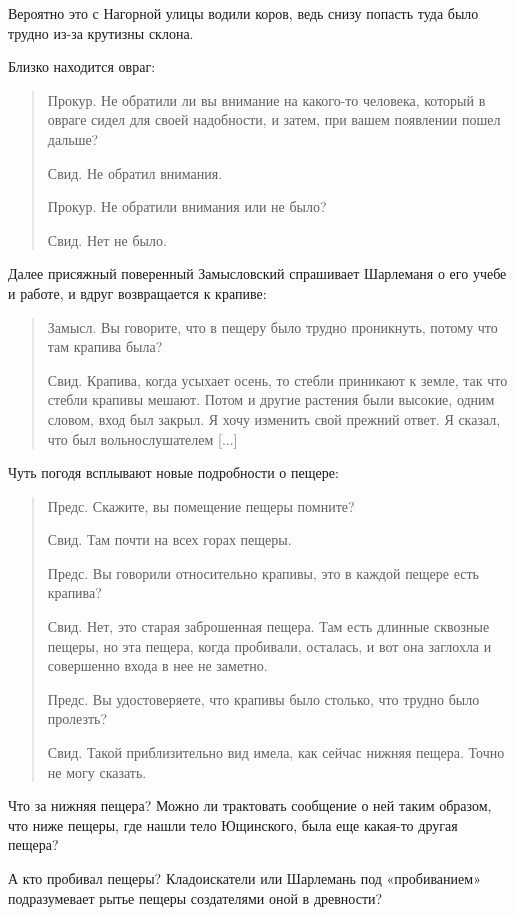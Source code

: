 Вероятно это с Нагорной улицы водили коров, ведь снизу попасть туда было трудно из-за крутизны склона.

Близко находится овраг:

\begin{quotation}
Прокур. Не обратили ли вы внимание на какого-то человека, который в овраге сидел для своей надобности, и затем, при вашем появлении пошел дальше?

Свид. Не обратил внимания.

Прокур. Не обратили внимания или не было?

Свид. Нет не было.
\end{quotation}

Далее присяжный поверенный Замысловский спрашивает Шарлеманя о его учебе и работе, и вдруг возвращается к крапиве:

\begin{quotation}
Замысл. Вы говорите, что в пещеру было трудно проникнуть, потому что там крапива была?

Свид. Крапива, когда усыхает осень, то стебли приникают к земле, так что стебли крапивы мешают. Потом и другие растения были высокие, одним словом, вход был закрыл. Я хочу изменить свой прежний ответ. Я сказал, что был вольнослушателем [...]
\end{quotation}

Чуть погодя всплывают новые подробности о пещере:

\begin{quotation}
Предс. Скажите, вы помещение пещеры помните?

Свид. Там почти на всех горах пещеры.

Предс. Вы говорили относительно крапивы, это в каждой пещере есть крапива?

Свид. Нет, это старая заброшенная пещера. Там есть длинные сквозные пещеры, но эта пещера, когда пробивали, осталась, и вот она заглохла и совершенно входа в нее не заметно.

Предс. Вы удостоверяете, что крапивы было столько, что трудно было пролезть?

Свид. Такой приблизительно вид имела, как сейчас нижняя пещера. Точно не могу сказать.\end{quotation}

Что за нижняя пещера? Можно ли трактовать сообщение о ней таким образом, что ниже пещеры, где нашли тело Ющинского, была еще какая-то другая пещера?

А кто пробивал пещеры? Кладоискатели или Шарлемань под «пробиванием» подразумевает рытье пещеры создателями оной в древности?


